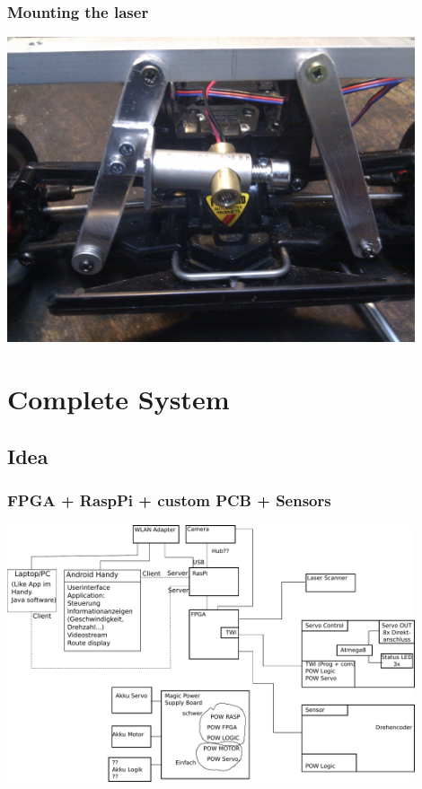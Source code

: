 \documentclass[pdf]{beamer}
\begin{document}
\begin{frame}
\frametitle{Mounting the laser}
  \begin{center}
  \includegraphics[width = 0.9\textwidth]{pics/raw/laser_mount2.jpg}
  \end{center}
\end{frame}

\section{Complete System}
\subsection{Idea}
\begin{frame}
\frametitle{FPGA + RaspPi + custom PCB + Sensors}
  \begin{center}
  \includegraphics[width = 0.9\textwidth]{pics/design.pdf}
  \end{center}
\end{frame}
\end{document}
